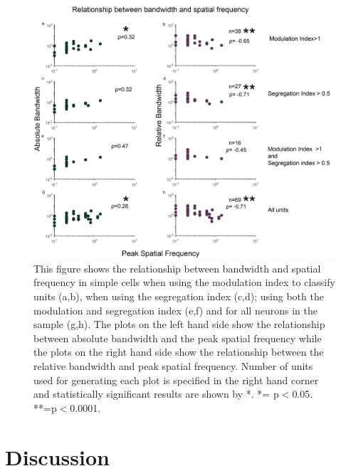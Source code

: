		\begin{figure}[]
		
		\includegraphics[width=\linewidth]{LinearV1/hwpksf.jpg}
		\caption{This figure shows the relationship between bandwidth and spatial frequency in simple cells when using the modulation index to classify units (a,b), when using the segregation index (c,d); using both the modulation and segregation index (e,f) and for all neurons in the sample (g,h). The plots on the left hand side show the relationship between absolute bandwidth and the peak spatial frequency while the plots on the right hand side show the relationship between the relative bandwidth and peak spatial frequency. Number of units used for generating each plot is specified in the right hand corner and statistically significant results are shown by *. *= p$<$0.05. **=p$<$0.0001.}
		\label{fig:fig5}
	\end{figure}
	
	
	\section{Discussion}